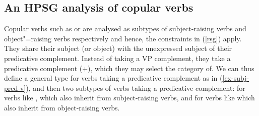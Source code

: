 \subsection{An HPSG analysis of copular verbs}
\label{control-sec-copula-verbs}
	
Copular verbs such as  or  are analysed as subtypes of subject-raising verbs
and object"=raising verbs respectively and hence, the constraints in (\ref{rsg}) apply. They share their subject (or object) with the
unexpressed subject of their predicative complement. Instead of taking a VP complement, they take a
predicative complement (\prd $+$), which they may select the category of.  We can thus define a general type for verbs taking a predicative complement as in (\ref{ex-subj-pred-v}), 
and then two subtypes of verbs taking a predicative complement:   for verbs like , which also inherit from subject-raising verbs, and  for verbs like  which also inherit from object-raising verbs.

\eal
\label{ex-subj-pred-v}
 \impl  {}
\zl

